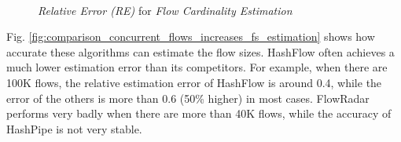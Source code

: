 \begin{figure}[ht!]
    \centering
    \mbox{
    }
    \caption{\emph{Relative Error (RE)} for \emph{Flow Cardinality Estimation}}
    \label{fig:comparison_concurrent_flows_increases_cardinality}
\end{figure}

Fig. \ref{fig:comparison_concurrent_flows_increases_fs_estimation} shows how accurate these algorithms
can estimate the flow sizes.  HashFlow often achieves a much lower estimation error 
than its competitors. For example, when there are 100K flows, the relative estimation error
of HashFlow is around 0.4, while the error of the others is more than 0.6 (50\% higher) in most cases. 
FlowRadar performs very badly when there are more than 40K flows, 
while the accuracy of HashPipe is not very stable.


